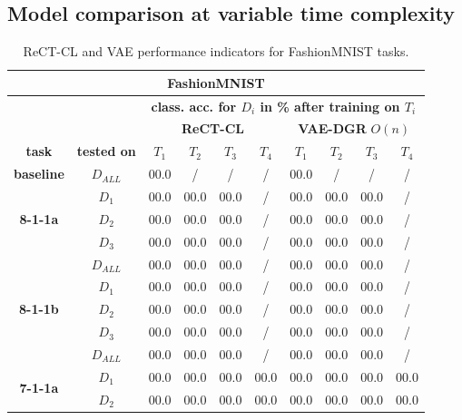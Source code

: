 \documentclass{article} %
\begin{document}
\subsection{Model comparison at variable time complexity}
\begin{table}
\caption{ReCT-CL and VAE performance indicators for FashionMNIST tasks.
\label{tab:expres_rectcl_fmnist}
}
\centering
\begin{tabular}{| c c | c c c c || c c c c |}
    \hline
    \multicolumn{10}{|c|}{\textbf{FashionMNIST}} \\
	\hline
	& & \multicolumn{8}{|c|}{\textbf{class. acc. for $D_i$ in \% after training on $T_i$}}       \\
	& & \multicolumn{4}{|c||}{\textbf{ReCT-CL}} & \multicolumn{4}{|c|}{\textbf{VAE-DGR} $O(n)$} \\
	\textbf{task} & \textbf{tested on}      & $T_1$ & $T_2$ & $T_3$ & $T_4$ & $T_1$ & $T_2$ & $T_3$ & $T_4$ \\
	\hline
	\textbf{baseline}                       & $D_{ALL}$ & 00.0 & / & / & /          & 00.0 & / & / & /       \\
	\hline
	\multirow{3}{3.25em}{\textbf{8-1-1a}}   & $D_1$     & 00.0 & 00.0 & 00.0 & /    & 00.0 & 00.0 & 00.0 & / \\
	                                        & $D_2$     & 00.0 & 00.0 & 00.0 & /    & 00.0 & 00.0 & 00.0 & / \\
	                                        & $D_3$     & 00.0 & 00.0 & 00.0 & /    & 00.0 & 00.0 & 00.0 & / \\
	                                        & $D_{ALL}$ & 00.0 & 00.0 & 00.0 & /    & 00.0 & 00.0 & 00.0 & / \\
	\hline
	\multirow{3}{3.25em}{\textbf{8-1-1b}}   & $D_1$     & 00.0 & 00.0 & 00.0 & /    & 00.0 & 00.0 & 00.0 & / \\
	                                        & $D_2$     & 00.0 & 00.0 & 00.0 & /    & 00.0 & 00.0 & 00.0 & / \\
	                                        & $D_3$     & 00.0 & 00.0 & 00.0 & /    & 00.0 & 00.0 & 00.0 & / \\
	                                        & $D_{ALL}$ & 00.0 & 00.0 & 00.0 & /    & 00.0 & 00.0 & 00.0 & / \\
	\hline
	\multirow{3}{3.25em}{\textbf{7-1-1a}}   & $D_1$     & 00.0 & 00.0 & 00.0 & 00.0     & 00.0 & 00.0 & 00.0 & 00.0 \\
	                                        & $D_2$     & 00.0 & 00.0 & 00.0 & 00.0     & 00.0 & 00.0 & 00.0 & 00.0 \\

\end{tabular}
\end{table}
\end{document}
